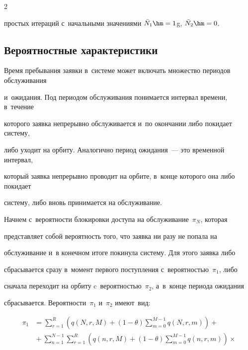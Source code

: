 \begin{multicols}{2}
\pagebreak

\noindent

прос\-тых итераций с~начальными значениями \mbox{$\bar{N}_1\hm=1$}g, $\bar{N}_2\hm=0$.





\subsection{Вероятностные характеристики} %



Время пребывания заявки в~сис\-те\-ме может включать множество периодов обслуживания

 и~ожидания. Под периодом обслуживания понимается интервал времени, в~течение 

которого за\-яв\-ка непрерывно обслуживается и~по окончании либо покидает сис\-те\-му, 

либо уходит на орбиту. Аналогично период ожидания~--- это временной интервал, 

который за\-яв\-ка непрерывно проводит на орбите, в~конце которого она либо покидает 

сис\-те\-му, либо вновь принимается на обслуживание.





Начнем с~ве\-ро\-ят\-ности блокировки доступа на обслуживание~$\pi_N$, которая 

пред\-став\-ля\-ет собой ве\-ро\-ят\-ность того, что за\-яв\-ка ни разу не попала на 

обслуживание и~в конечном итоге покинула сис\-те\-му. Для этого заявка либо 

сбрасывается сразу в~момент пер\-во\-го поступления с~ве\-ро\-ят\-ностью~$\pi_1$, либо 

сначала переходит на орбиту c~ве\-ро\-ят\-ностью~$\pi_2$, а~в~конце периода ожидания 

сбрасывается. Вероятности~$\pi_1$ и~$\pi_2$ име\-ют~вид:

\begin{align*} 


   \pi_1 &= \sum\limits_{r=1}^R \left( q(N,r,M)+ (1-\theta) \sum\limits_{m=0}^{M-1} q(N,r,m) 

\right) + {}\\

   & {}+ \sum\limits_{n=1}^{N-1} \sum\limits_{r=1}^R \left(q(n,r,M)+ (1-\theta) \!\! \sum\limits_{m=0}^{M-1} q(n,r,m) \right) \times{}\\


\end{align*}
\end{multicols}
